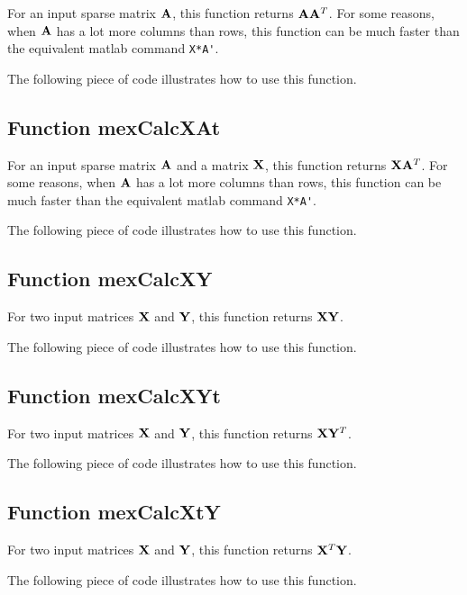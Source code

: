 \documentclass[a4paper, 11pt]{article}
\begin{document}
For an input sparse matrix ${\mathbf A}$, this function returns ${\mathbf A}{\mathbf A}^T$. For some reasons, when ${\mathbf A}$ has a lot more columns than rows, this function can be much faster than the equivalent matlab command \verb|X*A'|. 
%    

The following piece of code illustrates how to use this function.



\subsection{Function mexCalcXAt}
For an input sparse matrix ${\mathbf A}$ and a matrix ${\mathbf X}$, this function returns ${\mathbf X}{\mathbf A}^T$. For some reasons, when ${\mathbf A}$ has a lot more columns than rows, this function can be much faster than the equivalent matlab command \verb|X*A'|. 
%    

The following piece of code illustrates how to use this function.




\subsection{Function mexCalcXY}
For two input matrices ${\mathbf X}$ and ${\mathbf Y}$, this function returns ${\mathbf X}{\mathbf Y}$. 
%    

The following piece of code illustrates how to use this function.




\subsection{Function mexCalcXYt}
For two input matrices ${\mathbf X}$ and ${\mathbf Y}$, this function returns ${\mathbf X}{\mathbf Y}^T$.
%    

The following piece of code illustrates how to use this function.




\subsection{Function mexCalcXtY}
For two input matrices ${\mathbf X}$ and ${\mathbf Y}$, this function returns ${\mathbf X}^T{\mathbf Y}$.
%    

The following piece of code illustrates how to use this function.

\end{document}
